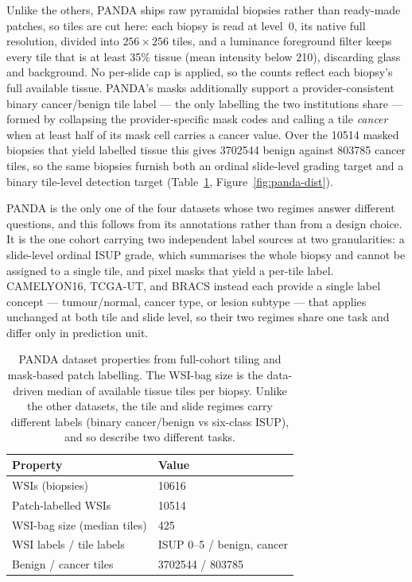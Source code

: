 \documentclass[11pt]{article}
\begin{document}
Unlike the others, PANDA ships raw pyramidal biopsies rather than ready-made patches, so tiles are cut
here: each biopsy is read at level~0, its native full resolution, divided into $256\times256$ tiles,
and a luminance foreground filter keeps every tile that is at least \num{35}\% tissue (mean intensity
below \num{210}), discarding glass and background. No per-slide cap is applied, so the counts reflect
each biopsy's full available tissue. PANDA's masks additionally support a provider-consistent binary
cancer/benign tile label --- the only labelling the two institutions share --- formed by collapsing the
provider-specific mask codes and calling a tile \emph{cancer} when at least half of its mask cell
carries a cancer value. Over the \num{10514} masked biopsies that yield labelled tissue this gives
\num{3702544} benign against \num{803785} cancer tiles, so the same biopsies furnish both an ordinal
slide-level grading target and a binary tile-level detection target (Table~\ref{tab:panda-summary},
Figure~\ref{fig:panda-dist}).

PANDA is the only one of the four datasets whose two regimes answer different questions, and this
follows from its annotations rather than from a design choice. It is the one cohort carrying two
independent label sources at two granularities: a slide-level ordinal ISUP grade, which summarises
the whole biopsy and cannot be assigned to a single tile, and pixel masks that yield a per-tile label.
CAMELYON16, TCGA-UT, and BRACS instead each provide a single label concept --- tumour/normal, cancer
type, or lesion subtype --- that applies unchanged at both tile and slide level, so their two regimes
share one task and differ only in prediction unit.

\begin{table}[ht]
  \centering
  \small
  \begin{tabular}{ll}
    \toprule
    Property & Value\\
    \midrule
    WSIs (biopsies) & \num{10616}\\
    Patch-labelled WSIs & \num{10514}\\
    WSI-bag size (median tiles) & \num{425}\\
    WSI labels / tile labels & ISUP 0--5 / benign, cancer\\
    Benign / cancer tiles & \num{3702544} / \num{803785}\\
    \bottomrule
  \end{tabular}
  \caption{PANDA dataset properties from full-cohort tiling and mask-based patch labelling.
  The WSI-bag size is the data-driven median of available tissue tiles per biopsy. Unlike the other
  datasets, the tile and slide regimes carry different labels (binary cancer/benign vs six-class
  ISUP), and so describe two different tasks.}
  \label{tab:panda-summary}
\end{table}
\end{document}
